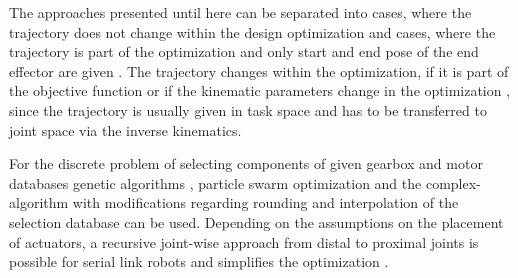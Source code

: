 \documentclass{svproc}
\begin{document}
The approaches presented until here can be separated into cases, where the trajectory does not change within the design optimization \cite{TarkianPerOelFen2011,ZhouBaiHan2011,Padilla-GarciaCruRod2015} and cases, where the trajectory is part of the optimization and only start and end pose of the end effector are given \cite{PetterssonAndKru2005,PetterssonOel2009,TarkianPerOelFen2011}.
The trajectory changes within the optimization, if it is part of the objective function or if the kinematic parameters change in the optimization \cite{TarkianLunOel2008,ZhouBai2015}, since the trajectory is usually given in task space and has to be transferred to joint space via the inverse kinematics.


For the discrete problem of selecting components of given gearbox and motor databases genetic algorithms \cite{TarkianPerOelFen2011,Padilla-GarciaCruRod2015}, particle swarm optimization \cite{RamirezKotOrt2017} and the complex-algorithm with modifications regarding rounding and interpolation of the selection database \cite{PetterssonAndKru2005,ZhouBaiHan2011} can be used.
Depending on the assumptions on the placement of actuators, a recursive joint-wise approach from distal to proximal joints is possible for serial link robots and simplifies the optimization \cite{ChedmailGau1990}.

\end{document}
